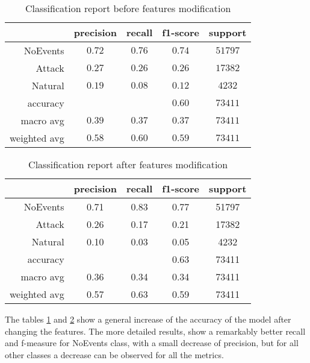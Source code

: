 \begin{table}[H]
    \centering
    \caption{Classification report before features modification} \label{tab:clreport:before}
    \begin{tabular}{rcccc}\toprule
        & precision    &recall & f1-score  & support \\\midrule
            NoEvents  &   $  0.72 $  &  $ 0.76 $  &  $ 0.74 $  & $ 51797 $\\
              Attack   &  $  0.27 $   & $ 0.26 $  &  $ 0.26 $  & $ 17382 $\\
             Natural   &  $  0.19 $   & $ 0.08 $  &  $ 0.12 $  & $  4232 $\\
            accuracy   &            &          &  $0.60$  &   $73411$ \\
           macro avg   &  $  0.39 $   & $ 0.37 $  &  $ 0.37 $  & $ 73411 $\\
        weighted avg   &  $  0.58 $  &  $ 0.60 $  &  $ 0.59 $ &  $ 73411 $\\\bottomrule
    \end{tabular}
\end{table}

\begin{table}[H]
    \centering
    \caption{Classification report after features modification} \label{tab:clreport:after}   
    \begin{tabular}{rcccc}\toprule
        &precision   & recall & f1-score &  support  \\\midrule

        NoEvents   &    0.71   &   0.83  &    0.77   &  51797 \\
          Attack    &   0.26   &   0.17  &    0.21   &  17382 \\
         Natural   &    0.10   &   0.03   &   0.05  &    4232 \\
    
        accuracy    &          &          &   0.63   &  73411 \\
       macro avg    &   0.36   &   0.34   &   0.34   &  73411 \\
    weighted avg     &  0.57   &   0.63   &   0.59   &  73411    \\     \bottomrule   
    \end{tabular}
\end{table}

The tables \ref{tab:clreport:before} and \ref{tab:clreport:after} show a general increase of the accuracy of the model after changing the features. The more detailed results, show a remarkably better recall and f-measure for NoEvents class, with a small decrease of precision, but for all other classes a decrease can be observed for all the metrics. 

